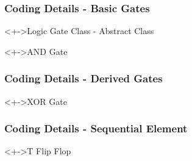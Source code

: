 \documentclass[10pt,red]{beamer}
\begin{document}
\begin{frame}
 \frametitle{Coding Details - Basic Gates}

\begin{block}<+->{Logic Gate Class - Abstract Class}

\begin{listing}
 
\end{listing}

\end{block}

\begin{block}<+->{AND Gate}
\begin{listing}
 
\end{listing}

\end{block}

\end{frame}


\begin{frame}
 \frametitle{Coding Details - Derived  Gates}

\begin{block}<+->{XOR Gate}

\begin{listing}
 
\end{listing}

\end{block}


\end{frame}


\begin{frame}
 \frametitle{Coding Details - Sequential Element}

\begin{block}<+->{T Flip Flop}

\begin{listing}
 
\end{listing}

\end{block}


\end{frame}
\end{document}
